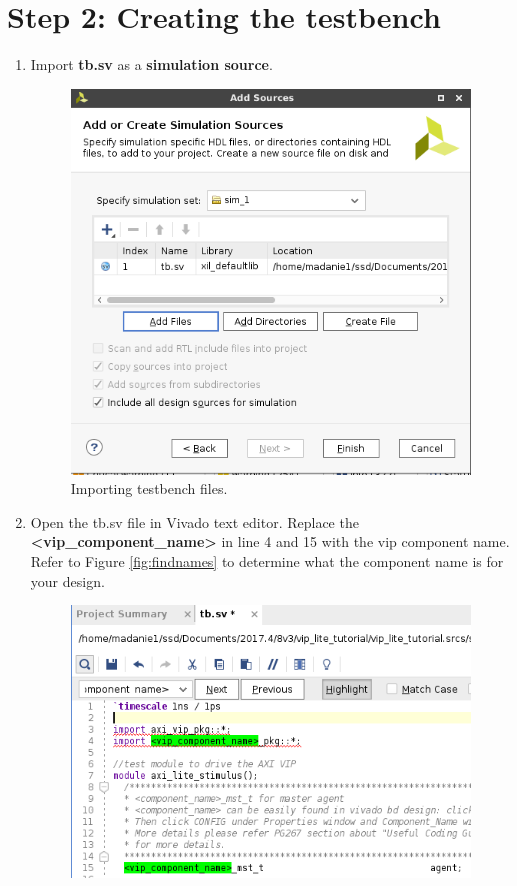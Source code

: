 \documentclass[12pt]{article}
\begin{document}
\section*{Step 2: Creating the testbench}
\begin{enumerate}
	\item Import \textbf{tb.sv} as a \textbf{simulation source}. 	
		\begin{figure}[H]
		  \centering
		  \includegraphics[scale=0.4]{addsimfiles.png}
		  \caption{Importing testbench files.}
		  \label{fig:addsimfilespng}
		\end{figure}
	\item Open the tb.sv file in Vivado text editor. Replace the \textbf{\textless vip\_component\_name\textgreater} in line 4 and 15 with the vip component name. Refer to Figure \ref{fig:findnames} to determine what the component name is for your design.
		\begin{figure}[H]
		  \centering
		  \includegraphics[scale=0.5]{componentname1.png}

\end{figure}
\end{enumerate}
\end{document}

